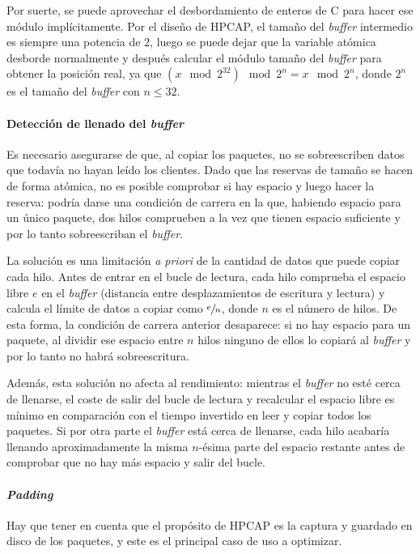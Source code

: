 \documentclass[twoside, 12pt]{epstfg}
\begin{document}
Por suerte, se puede aprovechar el desbordamiento de enteros de C para hacer ese módulo implícitamente. Por el diseño de HPCAP, el tamaño del \textit{buffer} intermedio es siempre una potencia de 2, luego se puede dejar que la variable atómica desborde normalmente y después calcular el módulo tamaño del \textit{buffer} para obtener la posición real, ya que $(x \mod 2^{32}) \mod 2^n = x \mod 2^n$, donde $2^n$ es el tamaño del \textit{buffer} con $n ≤ 32$.

\paragraph{Detección de llenado del \textit{buffer}} Es necesario asegurarse de que, al copiar los paquetes, no se sobreescriben datos que todavía no hayan leído los clientes. Dado que las reservas de tamaño se hacen de forma atómica, no es posible comprobar si hay espacio y luego hacer la reserva: podría darse una condición de carrera en la que, habiendo espacio para un único paquete, dos hilos comprueben a la vez que tienen espacio suficiente y por lo tanto sobreescriban el \textit{buffer}.

La solución es una limitación \textit{a priori} de la cantidad de datos que puede copiar cada hilo. Antes de entrar en el bucle de lectura, cada hilo comprueba el espacio libre $e$ en el \textit{buffer} (distancia entre desplazamientos de escritura y lectura) y calcula el límite de datos a copiar como $\sfrac{e}{n}$, donde $n$ es el número de hilos. De esta forma, la condición de carrera anterior desaparece: si no hay espacio para un paquete, al dividir ese espacio entre $n$ hilos ninguno de ellos lo copiará al \textit{buffer} y por lo tanto no habrá sobreescritura.

Además, esta solución no afecta al rendimiento: mientras el \textit{buffer} no esté cerca de llenarse, el coste de salir del bucle de lectura y recalcular el espacio libre es mínimo en comparación con el tiempo invertido en leer y copiar todos los paquetes. Si por otra parte el \textit{buffer} está cerca de llenarse, cada hilo acabaría llenando aproximadamente la misma $n$-ésima parte del espacio restante antes de comprobar que no hay más espacio y salir del bucle.

\paragraph{\textit{Padding}} Hay que tener en cuenta que el propósito de HPCAP es la captura y guardado en disco de los paquetes, y este es el principal caso de uso a optimizar.
\end{document}

